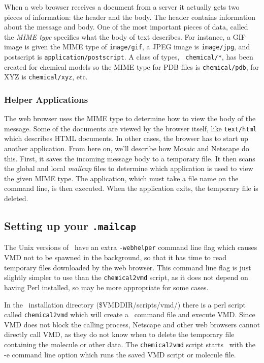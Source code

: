 When a web browser receives a document from a server it actually gets
two pieces of information: the header and the body.  The header
contains information about the message and body.  One of the most
important pieces of data, called the {\it MIME type} specifies what
the body of text describes.  For instance, a GIF image is given the
MIME type of {\tt image/gif}, a JPEG image is {\tt image/jpg}, and
postscript is {\tt application/postscript}.  A class of types, {\tt
chemical/*}, has been created for chemical models so the MIME type for
PDB files is {\tt chemical/pdb}, for XYZ is {\tt chemical/xyz}, etc.

\subsubsection{Helper Applications}

The web browser uses the MIME type to determine how to view the body
of the message.  Some of the documents are viewed by the browser
itself, like {\tt text/html} which describes HTML documents.  In other
cases, the browser has to start up another application.  From here on,
we'll describe how Mosaic and Netscape do this.  First, it saves the
incoming message body to a temporary file.  It then scans the global
and local {\it mailcap} files to determine which application is used
to view the given MIME type.  The application, which must take a file
name on the command line, is then executed.  When the application
exits, the temporary file is deleted.

\subsection{Setting up your {\tt .mailcap}}

The Unix versions of \VMD\ have an extra {\tt -webhelper} 
command line flag which causes VMD not to be spawned in the 
background, so that it has time to read temporary files downloaded
by the web browser.  This command line flag is just slightly simpler
to use than the {\tt chemical2vmd} script, as it does not depend on having
Perl installed, so may be more appropriate for some cases.   

In the \VMD\ installation directory (\$VMDDIR/scripts/vmd/) 
there is a perl script called {\tt chemical2vmd} 
which will create a \VMD\ command file and execute VMD.  Since 
VMD does not block the calling process, Netscape and other web 
browsers cannot directly call VMD, as they do not know when to 
delete the temporary file containing the molecule or other data.
The {\tt chemical2vmd} script starts \VMD\ with the -e command line 
option which runs the saved VMD script or molecule file.

